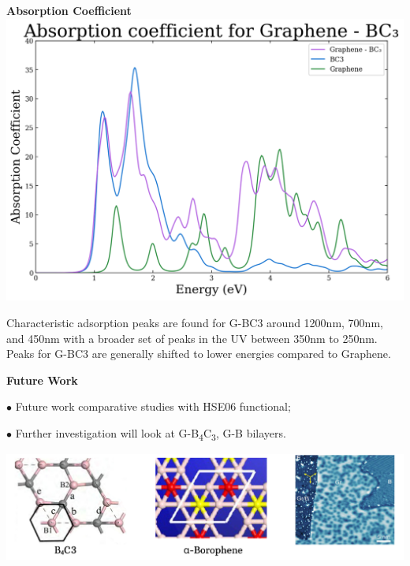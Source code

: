 \documentclass[a0paper,portrait]{baposter}
\begin{document}
\begin{poster}
{\vspace{5pt}\begin{minipage}[t]{0.4\linewidth}
    \begin{center}
        \small\textcolor{dark_blue}{\textbf{Absorption Coefficient}}
        \vspace{-5pt}\includegraphics[width=0.8\linewidth]{poster_figures/AC.pdf}
    \end{center}
    \footnotesize{
        \vspace{-10pt}\begin{tcolorbox}[colback=table_color_2, colframe=table_color_2, rounded corners, boxsep=2pt, left=0pt, right=0pt, top=0pt, bottom=0pt]
            Characteristic adsorption peaks are found for G-BC3 around 1200nm, 700nm, and 450nm with a broader set of peaks in the UV between 350nm to 250nm.
            Peaks for G-BC3 are generally shifted to lower energies compared to Graphene.
        \end{tcolorbox}}
\end{minipage}
\begin{minipage}[t]{0.56\linewidth}
    \begin{center}
        \small\textcolor{dark_blue}{\textbf{Future Work}}
    \end{center}
    \footnotesize{
        \begin{tcolorbox}[colback=table_color_2, colframe=table_color_2, rounded corners, boxsep=2pt, left=0pt, right=0pt, top=0pt, bottom=0pt]
            \par $\bullet$ Future work comparative studies with HSE06 functional;
            \par $\bullet$ Further investigation will look at G-B\textsubscript{4}C\textsubscript{3}, G-B bilayers.
        \end{tcolorbox}}
    \includegraphics[width=1\linewidth]{poster_figures/Future.png}

\end{minipage}}
\end{poster}
\end{document}

